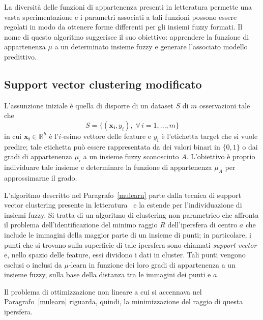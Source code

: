 \documentclass[12pt]{report}
\theoremstyle{definition}
\begin{document}
La diversità delle funzioni di appartenenza presenti in letteratura permette una vasta sperimentazione e i parametri associati a tali funzioni possono essere regolati in modo da ottenere forme differenti per gli insiemi fuzzy formati.
Il nome di questo algoritmo suggerisce il suo obiettivo: apprendere la funzione di appartenenza $\mu$ a un determinato insieme fuzzy e generare l'associato modello predittivo.

\subsection{Support vector clustering modificato}\label{svcmodified}
L'assunzione iniziale è quella di disporre di un dataset $S$ di $m$ osservazioni tale che
\begin{equation}
    S = \{(\mathbf{x_i}, y_i), \; \forall\,i=1, ..., m\}
\end{equation}
in cui $\mathbf{x_i} \in \mathbb{R}^h$ è l'$i$-esimo vettore delle feature e $y_i$ è l'etichetta target che si vuole predire; tale etichetta può essere rappresentata da dei valori binari in $\{0,1\}$ o dai gradi di appartenenza $\mu_i$ a un insieme fuzzy sconosciuto $A$.
L'obiettivo è proprio individuare tale insieme e determinare la funzione di appartenenza $\mu_A$ per approssimarne il grado.

L'algoritmo descritto nel Paragrafo~\ref{mulearn} parte dalla tecnica di support vector clustering presente in letteratura~\cite{23} e la estende per l'individuazione di insiemi fuzzy. Si tratta di un algoritmo di clustering non parametrico che affronta il problema dell'identificazione del minimo raggio $R$ dell'ipersfera di centro $a$ che include le immagini della maggior parte di un insieme di punti; in particolare, i punti che si trovano sulla superficie di tale ipersfera sono chiamati \textit{support vector} e, nello spazio delle feature, essi dividono i dati in cluster.
Tali punti vengono esclusi o inclusi da $\mu$-learn in funzione dei loro gradi di appartenenza a un insieme fuzzy, sulla base della distanza tra le immagini dei punti e $a$.

Il problema di ottimizzazione non lineare a cui si accennava nel Paragrafo~\ref{mulearn} riguarda, quindi, la minimizzazione del raggio di questa ipersfera.
\end{document}
